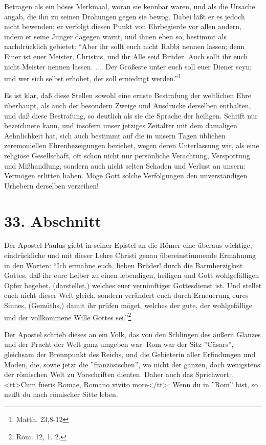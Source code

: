 Betragen als ein böses Merkmaal, woran sie kennbar waren, und als die Ursache angab, die ihn zu seinen Drohungen gegen sie bewog. Dabei läßt er es jedoch nicht bewenden; er verfolgt diesen Punkt von Ehrbegierde vor allen andern, indem er seine Junger dagegen warnt, und ihnen eben so, bestimmt als nachdrücklich gebietet: "`Aber ihr sollt euch nicht Rabbi nennen lassen; denn Einer ist euer Meister, Christus, und ihr Alle seid Brüder. Auch sollt ihr euch nicht Meister nennen lassen. .... Der Größeste unter euch soll euer Diener seyn; und wer sich selbst erhöhet, der soll erniedrigt werden."'\footnote{Matth. 23,8-12}

Es ist klar, daß diese Stellen sowohl eine ernste Bestrafung der weltlichen Ehre überhaupt, als auch der besondern Zweige und Ausdrucke derselben enthalten, und daß diese Bestrafung, so deutlich als sie die Sprache der heiligen. Schrift nur bezeichnete kann, und insofern unser jetziges Zeitalter mit dem damaligen Aehnlichkeit hat, sich auch bestimmt auf die in unsern Tagen üblichen zeremoniellen Ehrenbezeigungen beziehet, wegen deren Unterlassung wir, als eine religiöse Gesellschaft, oft schon nicht nur persönliche Verachtung, Verspottung und Mißhandlung, sondern auch nicht selten Schaden und Verlust an unsern: Vermögen erlitten haben. Möge Gott solche Verfolgungen den unverständigen Urhebern derselben verzeihen!

\section{33. Abschnitt}

Der Apostel Paulus giebt in seiner Epistel an die Römer eine überaus wichtige, eindrückliche und mit dieser Lehre Christi genau übereinstimmende Ermahnung in den Worten: "`Ich ermahne euch, lieben Brüder! durch die Barmherzigkeit Gottes, daß ihr eure Leiber zu einen lebendigen, heiligen und Gott wohlgefälligen Opfer begebet, (darstellet,) welches euer vernünftiger Gottesdienst ist. Und stellet euch nicht dieser Welt gleich, sondern verändert euch durch Erneuerung eures Sinnes, (Gemüths,) damit ihr prüfen möget, welches der gute, der wohlgefällige und der vollkommene Wille Gottes sei."'\footnote{Röm. 12, 1. 2.}

Der Apostel schrieb dieses an ein Volk, das von den Schlingen des äußern Glanzes und der Pracht der Welt ganz umgeben war. Rom war der Sitz ''Cäsars'', gleichsam der Brennpunkt des Reichs, und die Gebieterin aller Erfindungen und Moden, die, sowie jetzt die ''französischen'', wo nicht der ganzen, doch wenigstens der römischen Welt zu Vorschriften dienten. Daher auch das Sprichwort:. <tt>Cum fueris Romae, Romano vivito more</tt>: Wenn du in ''Rom'' bist, so mußt du nach römischer Sitte leben.

